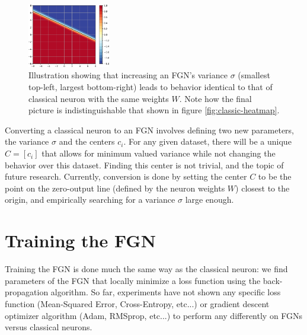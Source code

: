 \documentclass[12pt,oneside]{CUNY_PhD}
\begin{document}
\begin{figure}[!t]
    \includegraphics[width=0.32\textwidth]{images/Matching-behavior/sigma-7-cropped.png}
    \caption{Illustration showing that increasing an FGN's variance $\sigma$ (smallest top-left, largest bottom-right) leads to behavior identical to that of classical neuron with the same weights $W$. Note how the final picture is indistinguishable that shown in figure \ref{fig:classic-heatmap}. }
    \label{fig:matching}
\end{figure}

Converting a classical neuron to an FGN involves defining two new parameters, the variance $\sigma$ and the centers $c_i$. For any given dataset, there will be a unique $C=[c_i]$ that allows for minimum valued variance while not changing the behavior over this dataset. Finding this center is not trivial, and the topic of future research. Currently, conversion is done by setting the center $C$ to be the point on the zero-output line (defined by the neuron weights $W$) closest to the origin, and empirically searching for a variance $\sigma$ large enough.

\section{Training the FGN}
Training the FGN is done much the same way as the classical neuron: we find parameters of the FGN that locally minimize a loss function using the back-propagation algorithm. So far, experiments have not shown any specific loss function (Mean-Squared Error, Cross-Entropy, etc...) or gradient descent optimizer algorithm (Adam, RMSprop, etc...) to perform any differently on FGNs versus classical neurons.
\end{document}
